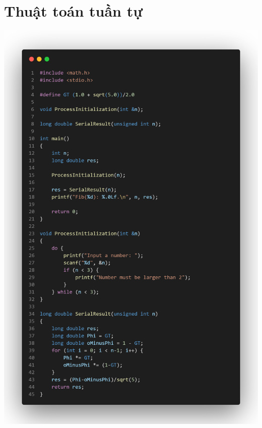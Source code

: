 \documentclass[12pt,a4paper]{report}
\begin{document}
\section{Thuật toán tuần tự}
\begin{center}
	\includegraphics[trim=0in 12in 0in 0in, clip, scale=0.35]{./Photos/Fibonacci/Serial.PNG}
\clearpage

\end{center}
\end{document}
